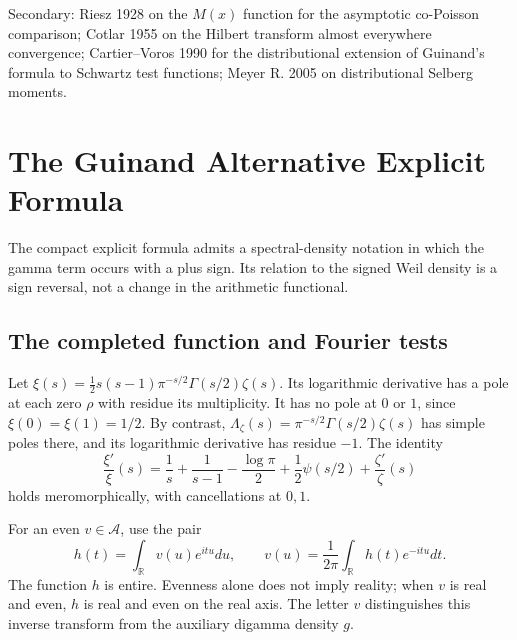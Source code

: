 Secondary: Riesz 1928 on the \(M(x)\) function for the asymptotic
co-Poisson comparison; Cotlar 1955 on the Hilbert transform almost
everywhere convergence; Cartier--Voros 1990 for the distributional
extension of Guinand's formula to Schwartz test functions; Meyer R.
2005 on distributional Selberg moments.

\section{The Guinand Alternative Explicit Formula}
\label{v4-arith:w7-i:guinand-explicit}

The compact explicit formula admits a spectral-density notation
in which the gamma term occurs with a plus sign. Its relation to
the signed Weil density is a sign reversal, not a change in the
arithmetic functional.

\subsection{The completed function and Fourier tests}
\label{v4-arith:w7-i:guinand:contour}
Let $\xi(s)=\tfrac12s(s-1)\pi^{-s/2}\Gamma(s/2)\zeta(s)$.
Its logarithmic derivative has a pole at each zero $\rho$ with
residue its multiplicity. It has no pole at $0$ or $1$, since
$\xi(0)=\xi(1)=1/2$.
By contrast, $\Lambda_\zeta(s)=\pi^{-s/2}\Gamma(s/2)\zeta(s)$
has simple poles there, and its logarithmic derivative has residue
$-1$. The identity
\[
 \frac{\xi'}{\xi}(s)=\frac1s+\frac1{s-1}-\frac{\log\pi}{2}
                +\frac12\psi(s/2)+\frac{\zeta'}{\zeta}(s)
\]
holds meromorphically, with cancellations at $0,1$.

\begin{definition}
\label{v4-arith:w7-i:def:fourier-pair}
For an even $v\in\mathscr A$, use the pair
\begin{equation}
\label{v4-arith:w7-i:eq:g-check}
 h(t)=\int_{\mathbb R}v(u)e^{itu}du,\qquad
 v(u)=\frac1{2\pi}\int_{\mathbb R}h(t)e^{-itu}dt.
\end{equation}
The function $h$ is entire. Evenness alone does not imply reality;
when $v$ is real and even, $h$ is real and even on the real axis.
The letter $v$ distinguishes this inverse transform from the
auxiliary digamma density $g$.
\end{definition}

